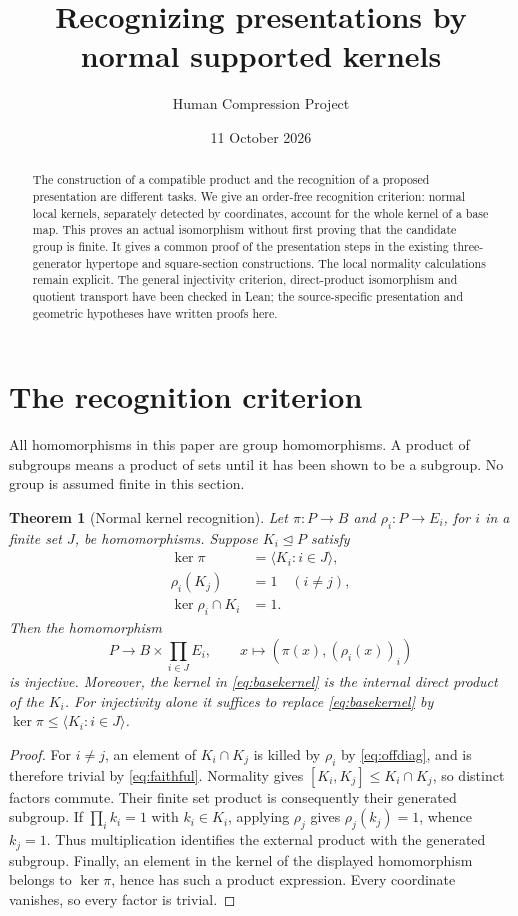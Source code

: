 \documentclass[11pt,a4paper]{article}
\title{Recognizing presentations by normal supported kernels}
\author{Human Compression Project}
\date{11 October 2026}
\newtheorem{theorem}{Theorem}
\theoremstyle{remark}\newtheorem{remark}[theorem]{Remark}
\newcommand{\gen}[1]{\langle #1\rangle}
\begin{document}
\maketitle
\begin{abstract}
The construction of a compatible product and the recognition of a proposed
presentation are different tasks. We give an order-free recognition criterion:
normal local kernels, separately detected by coordinates, account for the whole
kernel of a base map. This proves an actual isomorphism without first proving
that the candidate group is finite. It gives a common proof of the presentation
steps in the existing three-generator hypertope and square-section constructions.
The local normality calculations remain explicit. The general injectivity
criterion, direct-product isomorphism and quotient transport have been checked in Lean; the source-specific
presentation and geometric hypotheses have written proofs here.
\end{abstract}

\section{The recognition criterion}
All homomorphisms in this paper are group homomorphisms. A product of subgroups
means a product of sets until it has been shown to be a subgroup. No group is
assumed finite in this section.

\begin{theorem}[Normal kernel recognition]\label{thm:recognition}
Let $\pi:P\to B$ and $\rho_i:P\to E_i$, for $i$ in a finite set $J$, be
homomorphisms. Suppose $K_i\unlhd P$ satisfy
\begin{align}
 \ker\pi&=\gen{K_i:i\in J},\label{eq:basekernel}\\
 \rho_i(K_j)&=1\quad(i\ne j),\label{eq:offdiag}\\
 \ker\rho_i\cap K_i&=1.\label{eq:faithful}
\end{align}
Then the homomorphism
\[
 P\longrightarrow B\times\prod_{i\in J}E_i,
 \qquad x\longmapsto (\pi(x),(\rho_i(x))_i)
\]
is injective. Moreover, the kernel in \eqref{eq:basekernel} is the internal
direct product of the $K_i$. For injectivity alone it suffices to replace
\eqref{eq:basekernel} by $\ker\pi\leq\gen{K_i:i\in J}$.
\end{theorem}
\begin{proof}
For $i\ne j$, an element of $K_i\cap K_j$ is killed by $\rho_i$ by
\eqref{eq:offdiag}, and is therefore trivial by \eqref{eq:faithful}.
Normality gives $[K_i,K_j]\leq K_i\cap K_j$, so distinct factors commute.
Their finite set product is consequently their generated subgroup. If
$\prod_i k_i=1$ with $k_i\in K_i$, applying $\rho_j$ gives
$\rho_j(k_j)=1$, whence $k_j=1$. Thus multiplication identifies the external
product with the generated subgroup. Finally, an element in the kernel of the
displayed homomorphism belongs to $\ker\pi$, hence has such a product
expression. Every coordinate vanishes, so every factor is trivial.
\end{proof}
\end{document}
